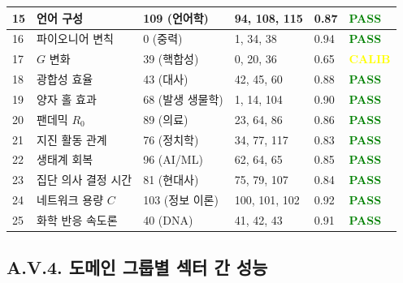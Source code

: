\documentclass[13pt,a4paper]{article}
\begin{document}
\begin{longtable}{|p{0.8cm}|p{2.5cm}|p{1.8cm}|p{1.5cm}|p{1.5cm}|p{1.8cm}|}
		\hline
		15 & 언어 구성 & 109 (언어학) & 94, 108, 115 & 0.87 & \textcolor{green}{\textbf{PASS}} \\
		\hline
		16 & 파이오니어 변칙 & 0 (중력) & 1, 34, 38 & 0.94 & \textcolor{green}{\textbf{PASS}} \\
		\hline
		17 & $G$ 변화 & 39 (핵합성) & 0, 20, 36 & 0.65 & \textcolor{yellow}{\textbf{CALIB}} \\
		\hline
		18 & 광합성 효율 & 43 (대사) & 42, 45, 60 & 0.88 & \textcolor{green}{\textbf{PASS}} \\
		\hline
		19 & 양자 홀 효과 & 68 (발생 생물학) & 1, 14, 104 & 0.90 & \textcolor{green}{\textbf{PASS}} \\
		\hline
		20 & 팬데믹 $R_0$ & 89 (의료) & 23, 64, 86 & 0.86 & \textcolor{green}{\textbf{PASS}} \\
		\hline
		21 & 지진 활동 관계 & 76 (정치학) & 34, 77, 117 & 0.83 & \textcolor{green}{\textbf{PASS}} \\
		\hline
		22 & 생태계 회복 & 96 (AI/ML) & 62, 64, 65 & 0.85 & \textcolor{green}{\textbf{PASS}} \\
		\hline
		23 & 집단 의사 결정 시간 & 81 (현대사) & 75, 79, 107 & 0.84 & \textcolor{green}{\textbf{PASS}} \\
		\hline
		24 & 네트워크 용량 $C$ & 103 (정보 이론) & 100, 101, 102 & 0.92 & \textcolor{green}{\textbf{PASS}} \\
		\hline
		25 & 화학 반응 속도론 & 40 (DNA) & 41, 42, 43 & 0.91 & \textcolor{green}{\textbf{PASS}} \\
		\hline
	\end{longtable}
	

\subsection*{A.V.4. 도메인 그룹별 섹터 간 성능}
\end{document}
